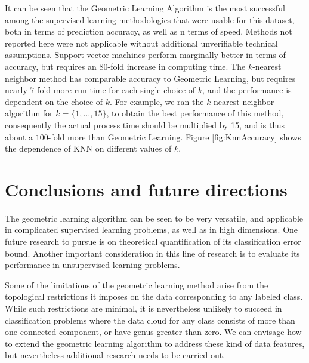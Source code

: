 \documentclass[twoside]{article}
\begin{document}
%


It can be seen that the Geometric Learning Algorithm is the most successful among the 
supervised learning methodologies that were usable for this dataset, both in terms 
of prediction accuracy, as well as n terms of speed. Methods not reported 
here were not applicable without additional unverifiable technical 
assumptions. Support vector machines perform marginally better in terms of accuracy, 
but requires an 80-fold increase in computing time. The $k$-nearest neighbor method 
has comparable accuracy to Geometric Learning, but requires nearly $7$-fold more run 
time for each single choice of $k$, and the performance is dependent on the choice of $k$.
For example, we ran the $k$-nearest neighbor algorithm for  $k = \{ 1, \ldots, 15 \}$, 
to obtain the best performance of this method, consequently the actual 
process time should be multiplied by 15, and is thus about a $100$-fold more than 
Geometric Learning. 
Figure \ref{fig:KnnAccuracy} shows the dependence of KNN on different values of $k$. 






\section{Conclusions and future directions}
\label{sec:Conclusions}

The geometric learning algorithm can be seen to be very versatile, and applicable in 
complicated supervised learning problems, as well as in high dimensions. 
One future research to pursue is on theoretical quantification of its classification 
error bound. Another important consideration in this line of research is to evaluate its 
performance in unsupervised learning problems. 

Some of the limitations of the geometric learning method arise from the topological 
restrictions it imposes on the data corresponding to any labeled class. While such 
restrictions are minimal, it is nevertheless unlikely to succeed in classification 
problems where the data cloud for any class consists of more than one connected 
component, or have genus greater than zero. We can envisage how to extend the geometric
learning algorithm to address these kind of data features, but nevertheless additional 
research needs to be carried out. 
\end{document}
